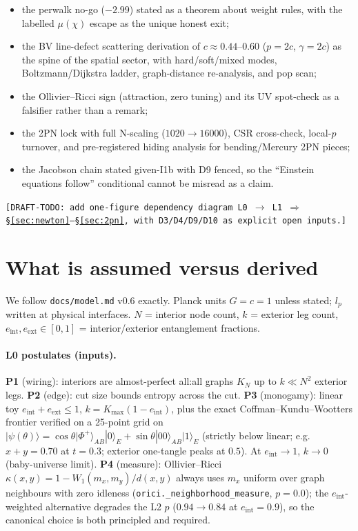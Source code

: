\documentclass[11pt]{article}
\begin{document}
\begin{itemize}
\item the perwalk no-go ($-2.99$) stated as a theorem about weight rules, with the labelled $\mu(\chi)$ escape as the unique honest exit;
\item the BV line-defect scattering derivation of $c \approx 0.44$--$0.60$ ($p = 2c$, $\gamma = 2c$) as the spine of the spatial sector, with hard/soft/mixed modes, Boltzmann/Dijkstra ladder, graph-distance re-analysis, and pop scan;
\item the Ollivier--Ricci sign (attraction, zero tuning) and its UV spot-check as a falsifier rather than a remark;
\item the 2PN lock with full N-scaling ($1020 \to 16000$), CSR cross-check, local-$p$ turnover, and pre-registered hiding analysis for bending/Mercury 2PN pieces;
\item the Jacobson chain stated given-I1b with D9 fenced, so the ``Einstein equations follow'' conditional cannot be misread as a claim.
\end{itemize}

\texttt{[DRAFT-TODO: add one-figure dependency diagram L0 $\to$ L1 $\Rightarrow$ \S\ref{sec:newton}--\S\ref{sec:2pn}, with D3/D4/D9/D10 as explicit open inputs.]}

\section{What is assumed versus derived}
\label{sec:model}

We follow \texttt{docs/model.md} v0.6 exactly. Planck units $G = c = 1$ unless stated; $l_p$ written at physical interfaces. $N$ = interior node count, $k$ = exterior leg count, $e_{\mathrm{int}}, e_{\mathrm{ext}} \in [0,1]$ = interior/exterior entanglement fractions.

\paragraph{L0 postulates (inputs).} \textbf{P1} (wiring): interiors are almost-perfect all:all graphs $K_N$ up to $k \ll N^2$ exterior legs. \textbf{P2} (edge): cut size bounds entropy across the cut. \textbf{P3} (monogamy): linear toy $e_{\mathrm{int}} + e_{\mathrm{ext}} \le 1$, $k = K_{\max}(1-e_{\mathrm{int}})$, plus the exact Coffman--Kundu--Wootters frontier verified on a 25-point grid on $|{\psi(\theta)}\rangle = \cos\theta|{\Phi^+}\rangle_{AB}|{0}\rangle_E + \sin\theta|{00}\rangle_{AB}|{1}\rangle_E$ (strictly below linear; e.g.\ $x+y = 0.70$ at $t = 0.3$; exterior one-tangle peaks at $0.5$). At $e_{\mathrm{int}} \to 1$, $k \to 0$ (baby-universe limit). \textbf{P4} (measure): Ollivier--Ricci $\kappa(x,y) = 1 - W_1(m_x,m_y)/d(x,y)$ always uses $m_x$ uniform over graph neighbours with zero idleness (\texttt{orici.\_neighborhood\_measure}, $p = 0.0$); the $e_{\mathrm{int}}$-weighted alternative degrades the L2 $p$ ($0.94 \to 0.84$ at $e_{\mathrm{int}} = 0.9$), so the canonical choice is both principled and required.
\end{document}
